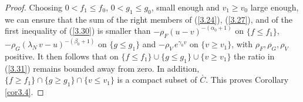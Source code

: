 \documentclass[12pt,leqno]{article}
\begin{document}
\begin{proof}
Choosing $0 < f_1 \le f_0$, $0 < g_1 \le g_0$, small enough and $v_1 \ge v_0$ large enough, we can ensure that the sum of the right members of (\ref{3.24}), (\ref{3.27}), and of the first inequality of (\ref{3.30}) is smaller than $- \rho_F (u-v)^{-(\alpha_0 + 1)}$ on $\{f \le f_1\}$, $- \rho_G(\lambda_N \, v-u)^{-(\beta_0 + 1)}$ on $\{ g \le g_1\}$ and $-\rho_V \, e^{\gamma_0 v}$ on $\{v \ge v_1\}$, with $\rho_F, \rho_G, \rho_V$ positive. It then follows that on $\{f \le f_1\} \cup \{ g \le g_1\} \cup \{v \ge v_1\}$ the ratio in (\ref{3.31}) remains bounded away from zero. In addition, $\{f \ge f_1\} \cap \{ g \ge g_1\} \cap \{ v \le v_1\}$ is a compact subset of  $\stackrel{_\circ}{C}$. This proves Corollary \ref{cor3.4}.
\end{proof}
\end{document}
